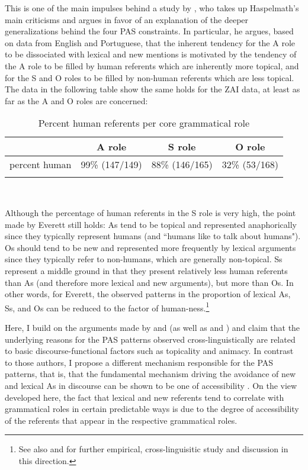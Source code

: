 This is one of the main impulses behind a study by \citet{everett2009}, who takes up Haspelmath's main criticisms and argues in favor of an explanation of the deeper generalizations behind the four PAS constraints. In particular, he argues, based on data from English and Portuguese, that the inherent tendency for the A role to be dissociated with lexical and new mentions is motivated by the tendency of the A role to be filled by human referents which are inherently more topical, and for the S and O roles to be filled by non-human referents which are less topical. The data in the following table show the same holds for the ZAI data, at least as far as the A and O roles are concerned:

\begin{table} 

\caption{{Percent human referents per core grammatical role}}
\begin{tabular}{ r  c  c  c }
\lsptoprule
 & A role & S role & O role\\

\midrule
percent human & 99{\%} (147/149) & 88{\%} (146/165) & 32{\%} (53/168)  \\
  
\lspbottomrule
\end{tabular}\\
\label{humandist}

\end{table}
Although the percentage of human referents in the S role is very high, the point made by Everett still holds: As tend to be topical and represented anaphorically since they typically represent humans (and ``humans like to talk about humans"). Os should tend to be new and represented more frequently by lexical arguments since they typically refer to non-humans, which are generally non-topical. Ss represent a middle ground in that they present relatively less human referents than As (and therefore more lexical and new arguments), but more than Os. In other words, for Everett, the observed patterns in the proportion of lexical As, Ss, and Os can be reduced to the factor of human-ness.\footnote{See also \citealt{haig2016} and \citealt{schnell2017} for further empirical, cross-linguisitic study and discussion in this direction.} 

Here, I build on the arguments made by \citet{haspelmath2006} and \citet{everett2009} (as well as \citealt{haig2016} and \citealt{schnell2017}) and claim that the underlying reasons for the PAS patterns observed cross-linguistically are related to basic discourse-functional factors such as topicality and animacy. In contrast to those authors, I propose a different mechanism responsible for the PAS patterns, that is, that the fundamental mechanism driving the avoidance of new and lexical As in discourse can be shown to be one of accessibility \citep{ariel1990,ariel2001}. On the view developed here, the fact that lexical and new referents tend to correlate with grammatical roles in certain predictable ways is due to the degree of accessibility of the referents that appear in the respective grammatical roles.

